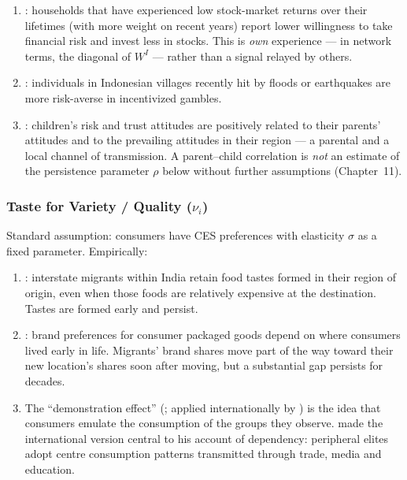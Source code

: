 \documentclass[../structural_economics_book.tex]{subfiles}
\begin{document}
\begin{stylizedfact}\label{ch09:prop:risk}
\leavevmode
\begin{enumerate}
\item \citet[\textit{QJE}]{malmendier2011depression}: households that have experienced low stock-market returns over their lifetimes (with more weight on recent years) report lower willingness to take financial risk and invest less in stocks. This is \textit{own} experience --- in network terms, the diagonal of $W^I$ --- rather than a signal relayed by others.
\item \citet[\textit{JHR}]{cameron2015risk}: individuals in Indonesian villages recently hit by floods or earthquakes are more risk-averse in incentivized gambles.
\item \citet[\textit{REStud}]{dohmen2012intergenerational}: children's risk and trust attitudes are positively related to their parents' attitudes and to the prevailing attitudes in their region --- a parental and a local channel of transmission. A parent--child correlation is \textit{not} an estimate of the persistence parameter $\rho$ below without further assumptions (Chapter~11).
\end{enumerate}
\end{stylizedfact}


\subsubsection{Taste for Variety / Quality ($\nu_i$)}

Standard assumption: consumers have CES preferences with elasticity $\sigma$ as a fixed parameter. Empirically:

\begin{stylizedfact}\label{ch09:prop:variety}
\leavevmode
\begin{enumerate}
\item \citet[\textit{AER}]{atkin2013trade}: interstate migrants within India retain food tastes formed in their region of origin, even when those foods are relatively expensive at the destination. Tastes are formed early and persist.
\item \citet[\textit{AER}]{bronnenberg2012evolution}: brand preferences for consumer packaged goods depend on where consumers lived early in life. Migrants' brand shares move part of the way toward their new location's shares soon after moving, but a substantial gap persists for decades.
\item The ``demonstration effect'' (\citealp{duesenberry1949income}; applied internationally by \citealp{nurkse1953problems}) is the idea that consumers emulate the consumption of the groups they observe. \citet{furtado1974mito} made the international version central to his account of dependency: peripheral elites adopt centre consumption patterns transmitted through trade, media and education.
\end{enumerate}
\end{stylizedfact}
\end{document}
